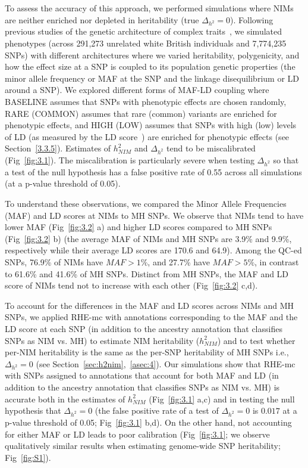 To assess the accuracy of this approach, we performed simulations where NIMs are neither enriched nor depleted in heritability (true $\Delta_{h^2}=0$). Following previous studies of the genetic architecture of complex traits~\cite{evans2018comparison,gazal}, we simulated phenotypes (across 291,273 unrelated white British individuals and 7,774,235 SNPs) with different architectures where we varied heritability, polygenicity, and how the effect size at a SNP is coupled to its population genetic properties (the minor allele frequency or MAF at the SNP and the linkage disequilibrium or LD around a SNP). We explored different forms of MAF-LD coupling where BASELINE assumes that SNPs with phenotypic effects are chosen randomly, RARE (COMMON) assumes that rare (common) variants are enriched for phenotypic effects, and HIGH (LOW) assumes that SNPs with high (low) levels of LD (as measured by the LD score~\cite{finucane2015partitioning}) are enriched for phenotypic effects (see Section~\ref{3.3.5}). Estimates of $h^2_{NIM}$ and $\Delta_{h^2}$ tend to be miscalibrated (Fig~\ref{fig:3.1}). The miscalibration is particularly severe when testing $\Delta_{h^2}$ so that a test of the null hypothesis has a false positive rate of 0.55 across all simulations (at a p-value threshold of 0.05).

To understand these observations, we compared the Minor Allele Frequencies (MAF) and LD scores at NIMs to MH SNPs. We observe that NIMs tend to have lower MAF (Fig~\ref{fig:3.2} a) and higher LD scores compared to MH SNPs (Fig~\ref{fig:3.2} b) (the average MAF of NIMs and MH SNPs are 3.9\% and 9.9\%, respectively while their average LD scores are 170.6 and 64.9). Among the QC-ed SNPs, 76.9\% of NIMs have $MAF > 1\%$, and 27.7\% have $MAF > 5\%$, in contrast to 61.6\% and 41.6\% of MH SNPs. Distinct from MH SNPs, the MAF and LD score of NIMs tend not to increase with each other (Fig~\ref{fig:3.2} c,d). 

To account for the differences in the MAF and LD scores across NIMs and MH SNPs, we applied RHE-mc with annotations corresponding to the MAF and the LD score at each SNP (in addition to the ancestry annotation that classifies SNPs as NIM vs. MH) to estimate NIM heritability ($h^2_{NIM}$) and to test whether per-NIM heritability is the same as the per-SNP heritability of MH SNPs i.e., $\Delta_{h^2}=0$ (see Section~\ref{sec:h2nim},~\ref{asec:4}). Our simulations show that RHE-mc with SNPs assigned to annotations that account for both MAF and LD (in addition to the ancestry annotation that classifies SNPs as NIM vs. MH) is accurate both in the estimates of $h^2_{NIM}$ (Fig~\ref{fig:3.1} a,c) and in testing the null hypothesis that $\Delta_{h^2}=0$ (the false positive rate of a test of $\Delta_{h^2} = 0$  is $0.017$ at a p-value threshold of 0.05; Fig~\ref{fig:3.1} b,d). On the other hand, not accounting for either MAF or LD leads to poor calibration (Fig~\ref{fig:3.1}; we observe qualitatively similar results when estimating genome-wide SNP heritability; Fig~\ref{fig:S1}).

